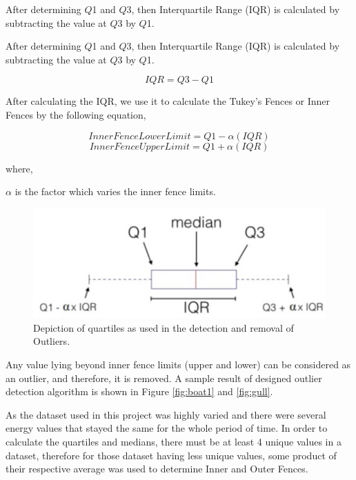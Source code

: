 \documentclass[conference]{IEEEtran}
\begin{document}
After determining $\mathit{Q}$1 and $\mathit{Q}$3, then Interquartile Range (IQR) is calculated by subtracting the value at $\mathit{Q}$3 by $\mathit{Q}$1.


After determining $\mathit{Q}$1 and $\mathit{Q}$3, then Interquartile Range (IQR) is calculated by subtracting the value at $\mathit{Q}$3 by $\mathit{Q}$1.

\begin{equation}
IQR = Q3 - Q1
\end{equation}

After calculating the IQR, we use it to calculate the Tukey's Fences or Inner Fences by the following equation,

\begin{equation}
InnerFenceLowerLimit = Q1 - \alpha (IQR)
\end{equation}
\begin{equation}
InnerFenceUpperLimit = Q1 + \alpha (IQR)
\end{equation}

where,

$\mathit{\alpha}$ is the factor which varies the inner fence limits.

\begin{figure}[t]
	\includegraphics[width=\linewidth]{IQR.jpg}
	\caption{Depiction of quartiles as used in the detection and removal of
		Outliers.}
	\label{fig:boat0}
\end{figure}

Any value lying beyond inner fence limits (upper and lower) can be considered as an 	outlier, and therefore, it is removed. A sample result of designed outlier detection 	algorithm is shown in Figure \ref{fig:boat1} and \ref{fig:gull}.

As the dataset used in this project was highly varied and there were several energy values that stayed the same for the whole period of time. In order to calculate the quartiles and medians, there must be at least 4 unique values in a dataset, therefore for those dataset having less unique values, some product of their respective average was used to determine Inner and Outer Fences. 
\end{document}
